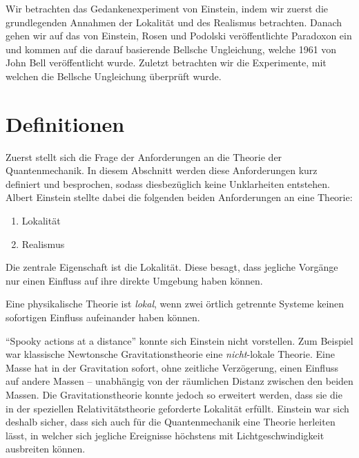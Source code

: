 \begin{refsection}
Wir betrachten das Gedankenexperiment von Einstein, indem wir zuerst die
grundlegenden Annahmen der Lokalit\"at und des Realismus betrachten. Danach
gehen wir auf das von Einstein, Rosen und Podolski ver\"offentlichte Paradoxon
ein und kommen auf die darauf basierende Bellsche Ungleichung, welche
1961 von John Bell ver\"offentlicht wurde.
Zuletzt betrachten wir die Experimente, mit welchen die Bellsche Ungleichung
\"uberpr\"uft wurde.

\section{Definitionen\label{section:bell:definitionen}}
Zuerst stellt sich die Frage der Anforderungen an die Theorie der
Quantenmechanik.
In diesem Abschnitt werden diese Anforderungen kurz definiert und
besprochen, sodass diesbez\"uglich keine Unklarheiten entstehen.
Albert Einstein stellte dabei die folgenden beiden Anforderungen an eine
Theorie:

\begin{enumerate}
    \item Lokalit\"at
    \item Realismus
\end{enumerate}

Die zentrale Eigenschaft ist die Lokalit\"at.
Diese besagt, dass jegliche Vorg\"ange nur einen Einfluss
auf ihre direkte Umgebung haben k\"onnen.

\begin{definition}\label{def:bell:lokalitaet}
    Eine physikalische Theorie ist \emph{lokal}, wenn zwei \"ortlich getrennte
    Systeme keinen sofortigen Einfluss aufeinander haben k\"onnen.
\end{definition}

\foreignquote{english}{Spooky actions at a distance} \cite[S.~158]{Bell:BornEinstein1971}
konnte sich Einstein nicht vorstellen.
Zum Beispiel war klassische Newtonsche Gravitationstheorie
eine \emph{nicht}-lokale Theorie. 
Eine Masse hat in der Gravitation sofort, ohne zeitliche 
Verz\"ogerung, einen Einfluss auf andere Massen -- unabh\"angig von der
r\"aumlichen Distanz zwischen den beiden Massen. 
Die Gravitationstheorie konnte jedoch so erweitert werden, dass sie die in der
speziellen Relativit\"atstheorie geforderte Lokalit\"at erf\"ullt.
Einstein war sich deshalb sicher, dass sich auch f\"ur die Quantenmechanik eine
Theorie herleiten l\"asst, in welcher sich jegliche Ereignisse h\"ochstens mit
Lichtgeschwindigkeit ausbreiten k\"onnen.


\end{refsection}
